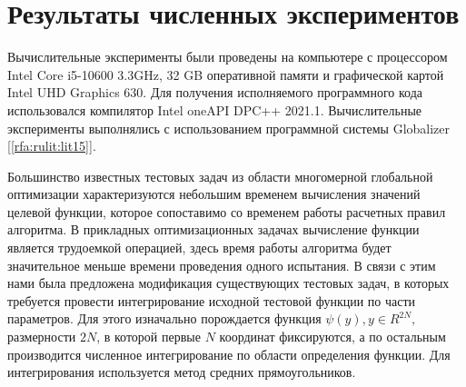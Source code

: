 \documentclass[10pt,a4paper]{book}
\begin{document}
\section{Результаты численных экспериментов}

Вычислительные эксперименты были проведены на компьютере с процессором Intel Core i5-10600 3.3GHz, 32 GB оперативной памяти и графической картой Intel UHD Graphics 630. Для получения исполняемого программного кода использовался компилятор Intel oneAPI DPC++ 2021.1.
Вычислительные эксперименты выполнялись с использованием  программной системы Globalizer [\ref{rfa:rulit:lit15}].

Большинство известных тестовых задач из области многомерной глобальной оптимизации характеризуются небольшим временем вычисления значений целевой функции, которое сопоставимо со временем работы расчетных правил алгоритма.
В прикладных оптимизационных задачах вычисление функции является трудоемкой операцией, здесь время работы алгоритма будет значительное меньше времени проведения одного испытания. 
В связи с этим нами была предложена модификация существующих тестовых задач, в которых требуется провести интегрирование исходной тестовой функции по части параметров. Для этого изначально порождается функция $\psi(y), y\in R^{2N},$ размерности $2N$, в которой первые $N$ координат фиксируются, а по остальным производится численное интегрирование по области определения функции. Для интегрирования используется метод средних прямоугольников. 
\end{document}
